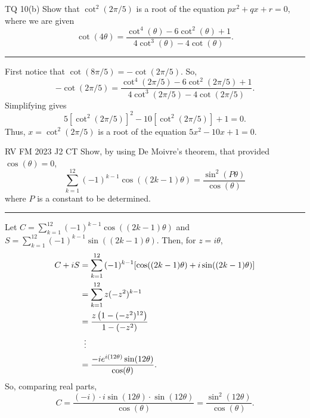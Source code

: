 \documentclass[oneside]{book}
\begin{document}
\begin{example}{TQ 10(b)}{}
  Show that \(\cot^2(2\pi/5)\) is a root of the equation \(px^2+qx+r=0\), where we are given 
  \[\cot(4\theta)=\frac{\cot^4(\theta)-6\cot^2(\theta)+1}{4\cot^3(\theta)-4\cot(\theta)}.\]
  \rule{20cm-137.0549pt}{0.05mm}
  First notice that \(\cot(8\pi/5)=-\cot(2\pi/5)\). So, 
  \[-\cot(2\pi/5)=\frac{\cot^4(2\pi/5)-6\cot^2(2\pi/5)+1}{4\cot^3(2\pi/5)-4\cot(2\pi/5)}.\]
  Simplifying gives 
  \[5[\cot^2(2\pi/5)]^2-10[\cot^2(2\pi/5)]+1=0.\]
  Thus, \(x=\cot^2(2\pi/5)\) is a root of the equation \(5x^2-10x+1=0\). 
\end{example}
\begin{example}{RV FM 2023 J2 CT}{}
  Show, by using De Moivre's theorem, that provided \(\cos(\theta)=0\), 
  \[\sum_{k=1}^{12}{(-1)^{k-1}\cos((2k-1)\theta)}=\frac{\sin^2(P\theta)}{\cos(\theta)}\]
  where \(P\) is a constant to be determined.

  \rule{20cm-137.0549pt}{0.05mm}

  Let \(C=\sum_{k=1}^{12}{(-1)^{k-1}\cos((2k-1)\theta)}\) and \(S=\sum_{k=1}^{12}{(-1)^{k-1}\sin((2k-1)\theta)}\). Then, for \(z=i\theta\),
  \begin{align*}
    C+iS &=\sum_{k=1}^{12}{(-1)^{k-1}[\cos((2k-1)\theta)+i\sin((2k-1)\theta)]}\\
    &=\sum_{k=1}^{12}{z(-z^2)^{k-1}}\\
    &=\frac{z\left(1-(-z^2)^{12}\right)}{1-(-z^2)}\\
    &\vdotswithin{=}\\
    &=\frac{-ie^{i(12\theta)}\sin(12\theta)}{\cos(\theta)}.
  \end{align*}
  So, comparing real parts,
  \[C=\frac{(-i)\cdot i\sin(12\theta) \cdot \sin(12\theta)}{\cos(\theta)}=\frac{\sin^2(12\theta)}{\cos(\theta)}.\]
\end{example}
\end{document}
